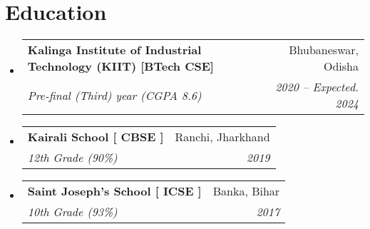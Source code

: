 \documentclass[letterpaper,11pt]{article}
\makeatletter
\newcommand{\resumeSubheading}[4]{
  \vspace{-2pt}\item
    \begin{tabular*}{0.97\textwidth}[t]{l@{\extracolsep{\fill}}r}
      \textbf{#1} & #2 \\
      \textit{\small#3} & \textit{\small #4} \\
    \end{tabular*}\vspace{-7pt}
}
\newcommand{\resumeSubHeadingListStart}{\begin{itemize}[leftmargin=0.15in, label={}]}
\newcommand{\resumeSubHeadingListEnd}{\end{itemize}}
\makeatother
\begin{document}
\section{Education}
  \resumeSubHeadingListStart
    \resumeSubheading
      {Kalinga Institute of Industrial Technology (KIIT) [BTech CSE]} {Bhubaneswar, Odisha}
      {Pre-final (Third) year (CGPA 8.6)}{2020 -- Expected. 2024}

    \resumeSubheading
      {Kairali School [ CBSE ]}{Ranchi, Jharkhand}
      {12th Grade (90\%)}{2019}

    \resumeSubheading
      {Saint Joseph's School [ ICSE ]}{Banka, Bihar}
      {10th Grade (93\%)}{2017}
  \resumeSubHeadingListEnd
\end{document}
